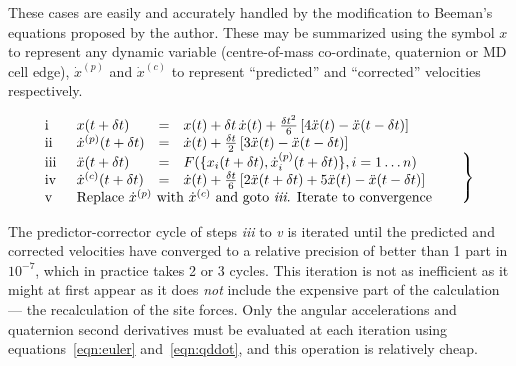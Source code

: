 \documentclass[a4paper,twoside]{report}
\begin{document}
These cases are easily and accurately handled by the modification to
Beeman's equations proposed by the author\cite{refson:85}.  These may
be summarized using the symbol $x$ to represent any dynamic variable
(centre-of-mass co-ordinate, quaternion or MD cell edge),
$\dot{x}^{(p)}$ and $\dot{x}^{(c)}$ to represent ``predicted'' and
``corrected'' velocities respectively.

\begin{equation}
  \begin{array}[c]{llcl}
    \textup{i} \quad & x(t+\delta t) &=& x(t) + \delta t \, \dot{x}(t) + 
    \frac{\delta t^2}{6} 
    \left [ 4 \ddot{x}(t) - \ddot{x}(t-\delta t) \right ] \\
    \textup{ii}  & \dot{x}^{(p)}(t+\delta t) & = & \dot{x}(t) + 
    \frac{\delta t}{2} \left [ 3 \ddot{x}(t)- \ddot{x}(t-\delta t) \right ]\\
    \textup{iii}  & \ddot{x}(t+\delta t) & = & F(\{ x_i(t+\delta t),
    \dot{x}_i^{(p)}(t+\delta t)\}, i =  1\ldots n) \\
    \textup{iv} & \dot{x}^{(c)}(t+\delta t) & = & \dot{x}(t) + \frac{\delta t}{6} 
    \left [ 2 \ddot{x}(t+\delta t) + 5 \ddot{x}(t)- \ddot{x}(t-\delta t) \right ]\\
    \textup{v} & \multicolumn{3}{l}{
      \textnormal{Replace $ \dot{x}^{(p)}$ with $\dot{x}^{(c)}$ and
    goto \emph{iii}.  Iterate to convergence}} 
  \end{array}
  \begin{array}[c]{l}
  \begin{array}{l}
    \strut\\
    \strut
  \end{array}\\
  \left .
  \begin{array}{l}
    \strut\\
    \strut\\
    \strut
  \end{array}
  \right \}
  \end{array}
  \label{eqn:beeman}
\end{equation}

The predictor-corrector cycle of steps \emph{iii} to \emph{v} is
iterated until the predicted and corrected velocities have converged
to a relative precision of better than 1 part in $10^{-7}$, which in
practice takes 2 or 3 cycles.  This iteration is not as inefficient as
it might at first appear as it does \emph{not} include the expensive
part of the calculation --- the recalculation of the site forces.
Only the angular accelerations and quaternion second derivatives must
be evaluated at each iteration using equations~\ref{eqn:euler} 
and~\ref{eqn:qddot}, and this operation is relatively cheap.
\end{document}
